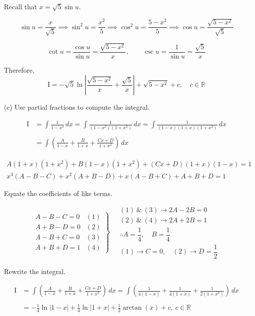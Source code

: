 \documentclass{article}
\begin{document}
\hfill

\noindent Recall that $\displaystyle x=\sqrt5\sin u$.

\[\sin u=\frac x{\sqrt5}\implies\sin^2u=\frac{x^2}5\implies\cos^2 u=\frac{5-x^2}5\implies\cos u=\frac{\sqrt{5-x^2}}{\sqrt5}\]

\[\cot u=\frac{\cos u}{\sin u}=\frac{\sqrt{5-x^2}}x,\qquad\csc u=\frac1{\sin u}=\frac{\sqrt5}x\]

\hfill

\noindent Therefore,
\[\mathrm{I}=\boxed{-\sqrt5\ln\left|\frac{\sqrt{5-x^2}}x+\frac{\sqrt5}x\right|+\sqrt{5-x^2}+c,\quad c\in\mathbb{R}}\]

\hfill

\noindent (c) Use partial fractions to compute the integral.

\begin{align*}\mathrm{I}&=\int\frac1{1-x^4}\,dx=\int\frac1{\left(1-x^2\right)\left(1+x^2\right)}\,dx=\int\frac1{(1-x)(1+x)\left(1+x^2\right)}\,dx\\\\&=\int\left(\frac A{1-x}+\frac B{1+x}+\frac{Cx+D}{1+x^2}\right)\,dx\end{align*}

\hfill

\[\begin{array}{c}
A(1+x)\left(1+x^2\right)+B(1-x)\left(1+x^2\right)+(Cx+D)(1+x)(1-x)=1\\
x^3(A-B-C)+x^2\left(A+B-D\right)+x\left(A-B+C\right)+A+B+D=1
\end{array}\]

\hfill

\noindent Equate the coefficients of like terms.

\[\left.\begin{array}{rc}
A-B-C=0&(1)\\
A+B-D=0&(2)\\
A-B+C=0&(3)\\
A+B+D=1&(4)
\end{array}\right\}\quad\begin{array}{c}
(1)\:\&\:(3)\rightarrow2A-2B=0\\
(2)\:\&\:(4)\rightarrow2A+2B=1\\[1em]
\therefore A=\dfrac14,\quad B=\dfrac14\\[1em]
(1)\rightarrow C=0,\quad (2)\rightarrow D=\dfrac12
\end{array}\]

\noindent Rewrite the integral.

\begin{align*}\mathrm{I}&=\int\left(\frac A{1-x}+\frac B{1+x}+\frac{Cx+D}{1+x^2}\right)\,dx=\int\left(\frac1{4(1-x)}+\frac1{4(1+x)}+\frac1{2\left(1+x^2\right)}\right)\,dx\\\\&=\boxed{-\frac14\ln|1-x|+\frac14\ln|1+x|+\frac12\arctan\left(x\right)+c,\: c\in\mathbb{R}}\end{align*}
\end{document}
